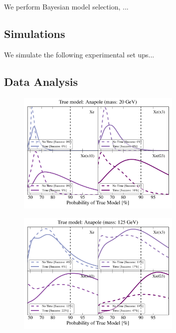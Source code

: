 \documentclass[11pt]{article}
\begin{document}
We perform Bayesian model selection, ...

\subsection{Simulations}

We simulate the following experimental set ups...

\subsection{Data Analysis}

\begin{figure}
\centering
\includegraphics[width=0.7\textwidth]{plots/PDF_20GeV_Anapole_50sims_Xe_Xe3x_Xe10x_XeG3_GF_TNT.pdf}
\caption{\label{fig:500gev_anapole_XeFull_TNT_GF}}
\end{figure}

\begin{figure}
\centering
\includegraphics[width=0.7\textwidth]{plots/PDF_125GeV_Anapole_50sims_Xe_Xe3x_Xe10x_XeG3_GF_TNT.pdf}
\caption{\label{fig:500gev_anapole_XeFull_TNT_GF}}
\end{figure}
\end{document}
